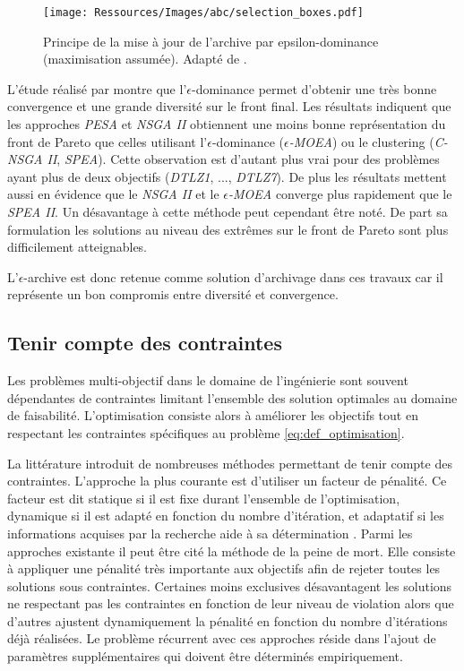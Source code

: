 \begin{figure}
    \begin{center}
        \texttt{[image: Ressources/Images/abc/selection\_boxes.pdf]}
    \end{center}
    \caption{Principe de la mise à jour de l’archive par epsilon-dominance (maximisation assumée).
             Adapté de \cite{Deb2005501}.
             \label{fig:epsilon_dominance}}
\end{figure}

L’étude réalisé par \cite{Deb2005501} montre que l’$\epsilon$-dominance permet
d’obtenir une très bonne convergence et une grande diversité sur le front final.
Les résultats indiquent que les approches \textit{PESA} et \textit{NSGA II} obtiennent une moins
bonne représentation du front de Pareto que celles utilisant l’$\epsilon$-dominance
(\textit{$\epsilon$-MOEA}) ou le clustering (\textit{C-NSGA II}, \textit{SPEA}).
Cette observation est d’autant plus vrai pour des problèmes ayant plus de deux
objectifs (\textit{DTLZ1}, ..., \textit{DTLZ7}).
De plus les résultats mettent aussi en évidence que le \textit{NSGA II} et le \textit{$\epsilon$-MOEA}
converge plus rapidement que le \textit{SPEA II}.
Un désavantage à cette méthode peut cependant être noté. De part sa formulation
les solutions au niveau des extrêmes sur le front de Pareto sont plus difficilement
atteignables.

L’$\epsilon$-archive est donc retenue comme solution d’archivage dans ces travaux
car il représente un bon compromis entre diversité et convergence.


\subsection{Tenir compte des contraintes} %
\label{sub:tenir_compte_des_contraintes}
Les problèmes multi-objectif dans le domaine de l’ingénierie sont souvent
dépendantes de contraintes limitant l’ensemble des solution optimales au domaine
de faisabilité. L’optimisation consiste alors à améliorer les objectifs tout en
respectant les contraintes spécifiques au problème \eqref{eq:def_optimisation}.

La littérature introduit de nombreuses méthodes permettant de tenir compte des
contraintes. L’approche la plus courante est d’utiliser un facteur de pénalité. Ce facteur
est dit statique si il est fixe durant l’ensemble de l’optimisation, dynamique si il est
adapté en fonction du nombre d’itération, et adaptatif si les informations acquises par la
recherche aide à sa détermination \parencite{Coello2002}. Parmi les approches existante il
peut être cité la méthode de la peine de mort. Elle consiste à appliquer une pénalité très
importante aux objectifs afin de rejeter toutes les solutions sous contraintes. Certaines
moins exclusives désavantagent les solutions ne respectant pas les contraintes en fonction
de leur niveau de violation alors que d’autres ajustent dynamiquement la pénalité en
fonction du nombre d’itérations déjà réalisées. Le problème récurrent avec ces approches
réside dans l’ajout de paramètres supplémentaires qui doivent être déterminés empiriquement.

